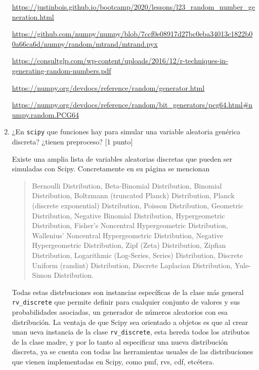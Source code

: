 \documentclass{article}
\begin{document}
\begin{enumerate}
    \url{https://justinbois.github.io/bootcamp/2020/lessons/l23_random_number_generation.html}

    \url{https://github.com/numpy/numpy/blob/7ccf0e08917d27bc0eba34013c1822b00a66ca6d/numpy/random/mtrand/mtrand.pyx}

    \url{https://consultglp.com/wp-content/uploads/2016/12/r-techniques-in-generating-random-numbers.pdf}

    \url{https://numpy.org/devdocs/reference/random/generator.html}

    \url{https://numpy.org/devdocs/reference/random/bit_generators/pcg64.html#numpy.random.PCG64}


    \item ¿En \texttt{scipy} que funciones hay para simular una variable aleatoria 
    genérica discreta? ¿tienen preproceso? [1 punto]


    Existe una amplia lista de variables aleatorias discretas que pueden ser simuladas con Scipy. Concretamente
    en su página se mencionan 

    \begin{quote}
    Bernoulli Distribution,
    Beta-Binomial Distribution,
    Binomial Distribution,
    Boltzmann (truncated Planck) Distribution,
    Planck (discrete exponential) Distribution,
    Poisson Distribution,
    Geometric Distribution,
    Negative Binomial Distribution,
    Hypergeometric Distribution,
    Fisher’s Noncentral Hypergeometric Distribution,
    Wallenius’ Noncentral Hypergeometric Distribution,
    Negative Hypergeometric Distribution,
    Zipf (Zeta) Distribution,
    Zipfian Distribution,
    Logarithmic (Log-Series, Series) Distribution,
    Discrete Uniform (randint) Distribution,
    Discrete Laplacian Distribution,
    Yule-Simon Distribution.
    \end{quote}

    Todas estas distrbuciones son instancias específicas de la clase más general \texttt{rv\_discrete}
    que permite definir para cualquier conjunto de valores y sus probabilidades asociadas, un generador de números
    aleatorios con esa distribución. La ventaja de que Scipy sea orientado a objetos es que al crear unan
    ueva instancia de la clase \texttt{rv\_discrete}, esta hereda todos los atributos de la clase madre, y
    por lo tanto al especificar una nueva distribución discreta, ya se cuenta con todas las herramientas
    usuales de las distribuciones que vienen implementadas en Scipy, como pmf, rvs, cdf, etcétera.


\end{enumerate}
\end{document}
